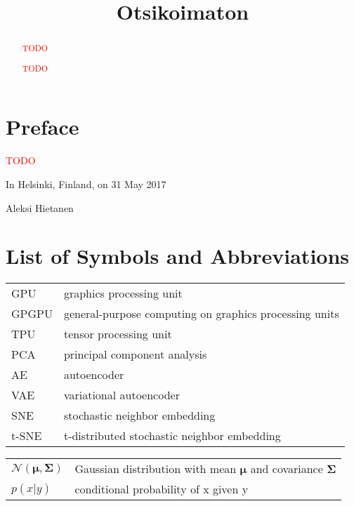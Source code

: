 \begin{abstract}

\textcolor{red}{TODO}

\end{abstract}

\begin{otherlanguage}{finnish}

\title{Otsikoimaton}
\examiner{}
\keywords{}

\begin{abstract}

\textcolor{red}{TODO}

\end{abstract}
\end{otherlanguage}

\chapter*{Preface}

\textcolor{red}{TODO}

\vspace{2\baselineskip}

In Helsinki, Finland, on 31 May 2017

\vspace{2\baselineskip}

Aleksi Hietanen

\tableofcontents
\listoffigures
\listoftables
\chapter*{List of Symbols and Abbreviations}


\begin{tabular}[h]{@{} p{} p{} @{}}
GPU & graphics processing unit \\
GPGPU & general-purpose computing on graphics processing units \\
TPU & tensor processing unit \\
PCA & principal component analysis \\
AE & autoencoder \\
VAE & variational autoencoder \\
SNE & stochastic neighbor embedding \\
t-SNE & t-distributed stochastic neighbor embedding
\end{tabular}

\begin{tabular}[h]{@{} p{} p{} @{}}
$\mathcal{N}(\mathbf{\mu}, \mathbf{\Sigma})$ & Gaussian distribution with mean $\mathbf{\mu}$ and covariance $\mathbf{\Sigma}$ \\
$p(x \vert y)$ & conditional probability of x given y
\end{tabular}
